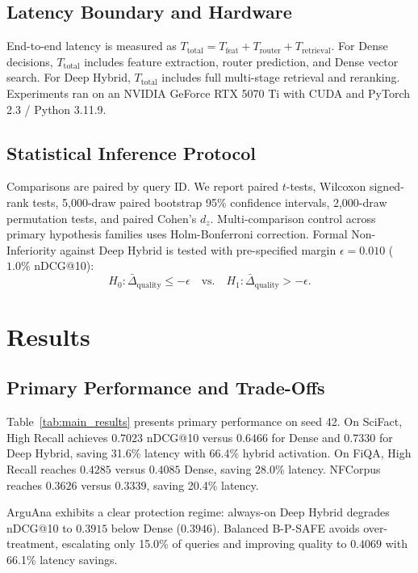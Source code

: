 \documentclass[10pt,journal]{IEEEtran}
\makeatletter
\newcommand{\bpsafe}{B-P-SAFE}
\newcommand{\ndcg}{nDCG@10}
\makeatother
\begin{document}
\subsection{Latency Boundary and Hardware}
End-to-end latency is measured as $T_{\mathrm{total}} = T_{\mathrm{feat}} + T_{\mathrm{router}} + T_{\mathrm{retrieval}}$. For Dense decisions, $T_{\mathrm{total}}$ includes feature extraction, router prediction, and Dense vector search. For Deep Hybrid, $T_{\mathrm{total}}$ includes full multi-stage retrieval and reranking. Experiments ran on an NVIDIA GeForce RTX 5070 Ti with CUDA and PyTorch 2.3 / Python 3.11.9.

\subsection{Statistical Inference Protocol}
Comparisons are paired by query ID. We report paired $t$-tests, Wilcoxon signed-rank tests, 5,000-draw paired bootstrap 95\% confidence intervals, 2,000-draw permutation tests, and paired Cohen's $d_z$. Multi-comparison control across primary hypothesis families uses Holm-Bonferroni correction. Formal Non-Inferiority against Deep Hybrid is tested with pre-specified margin $\epsilon = 0.010$ ($1.0\%$ \ndcg{}):
\begin{equation}
H_0: \bar{\Delta}_{\mathrm{quality}} \le -\epsilon \quad \text{vs.} \quad H_1: \bar{\Delta}_{\mathrm{quality}} > -\epsilon.
\end{equation}

\section{Results}
\label{sec:results}

\subsection{Primary Performance and Trade-Offs}



Table~\ref{tab:main_results} presents primary performance on seed 42. On SciFact, High Recall achieves $0.7023$ \ndcg{} versus $0.6466$ for Dense and $0.7330$ for Deep Hybrid, saving 31.6\% latency with 66.4\% hybrid activation. On FiQA, High Recall reaches $0.4285$ versus $0.4085$ Dense, saving 28.0\% latency. NFCorpus reaches $0.3626$ versus $0.3339$, saving 20.4\% latency.

ArguAna exhibits a clear protection regime: always-on Deep Hybrid degrades \ndcg{} to $0.3915$ below Dense ($0.3946$). Balanced \bpsafe{} avoids over-treatment, escalating only 15.0\% of queries and improving quality to $0.4069$ with 66.1\% latency savings.
\end{document}
